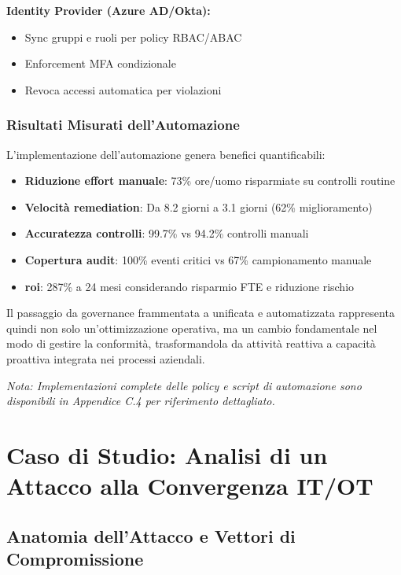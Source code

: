 \textbf{Identity Provider (Azure AD/Okta):}
\begin{itemize}
    \item Sync gruppi e ruoli per policy RBAC/ABAC
    \item Enforcement MFA condizionale
    \item Revoca accessi automatica per violazioni
\end{itemize}

\subsubsection{Risultati Misurati dell'Automazione}

L'implementazione dell'automazione genera benefici quantificabili:

\begin{itemize}
    \item \textbf{Riduzione effort manuale}: 73\% ore/uomo risparmiate su controlli routine
    \item \textbf{Velocità remediation}: Da 8.2 giorni a 3.1 giorni (62\% miglioramento)
    \item \textbf{Accuratezza controlli}: 99.7\% vs 94.2\% controlli manuali
    \item \textbf{Copertura audit}: 100\% eventi critici vs 67\% campionamento manuale
    \item \textbf{\gls{roi}}: 287\% a 24 mesi considerando risparmio FTE e riduzione rischio
\end{itemize}

Il passaggio da \gls{governance} frammentata a unificata e automatizzata rappresenta quindi non solo un'ottimizzazione operativa, ma un cambio fondamentale nel modo di gestire la conformità, trasformandola da attività reattiva a capacità proattiva integrata nei processi aziendali.

\textit{Nota: Implementazioni complete delle policy e script di automazione sono disponibili in Appendice C.4 per riferimento dettagliato.}

\section{\texorpdfstring{\textbf{Caso di Studio: Analisi di un Attacco alla Convergenza IT/OT}}{4.5 - Caso di Studio: Analisi di un Attacco alla Convergenza IT/OT}}

\subsection{Anatomia dell'Attacco e Vettori di Compromissione}

